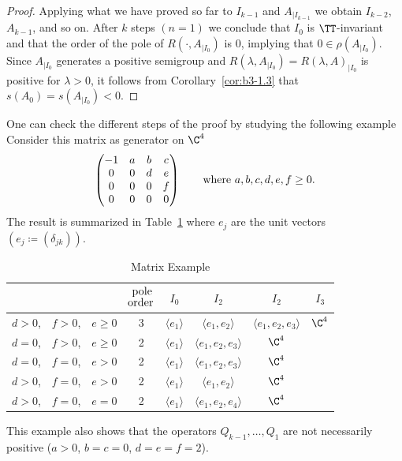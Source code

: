 \begin{proof}
	Applying what we have proved so far to $I_{k-1}$ and $A_{|I_{k-1}}$ we obtain $I_{k-2}$, $A_{k-1}$, and so on.
	After $k$ steps $(n=1)$ we conclude that $I_{0}$ is $\TT$-invariant and that the order of the pole of\/ $R(\cdot,A_{|I_{0}})$ is $0$, 
	implying that $0 \in \rho(A_{|I_{0}})$.
	Since $A_{|I_{0}}$ generates a positive semigroup and $R(\lambda,A_{|I_{0}}) = R(\lambda,A)_{|I_{0}}$ is positive for $\lambda > 0$, it follows from Corollary~\ref{cor:b3-1.3} that $s(A_{0}) = s(A_{|I_{0}}) < 0$.
\end{proof}
One can check the different steps of the proof by studying the following example
Consider this matrix as generator on $\C^{4}$
\[
\begin{pmatrix}
	-1 & a & b & c \\
	0 & 0 & d & e \\
	0 & 0 & 0 & f \\
	0 & 0 & 0 & 0
\end{pmatrix}
\quad \quad \text{where $ a,b,c,d,e,f \geq 0 $.} 
\]
The result is summarized in Table~\ref{tab:b3-table1} where 
$e_{j}$ are the unit vectors $(e_{j} \coloneqq (\delta_{jk}))$.
\begin{table}[ht!]%
% 
\begin{center}
 \caption{Matrix Example}\label{tab:b3-table1}
\begin{tabular}{lll|c|cccc} %
		 &&& $ \overset{\text{\normalsize pole}}{\text{order}}$ & $I_0$ & $I_2$ & $I_2$ & $I_3$ \\[1ex]\hline
		$ d > 0 $, & $ f>0 $, &  $ e \ge 0 $ & 3 & $\langle e_1 \rangle$ &  $\langle e_1, e_2 \rangle$ &  $\langle e_1, e_2, e_3 \rangle$ &  $\C^4$\\
		$ d = 0 $, & $ f > 0 $, & $ e \ge 0 $ & 2 & $\langle e_1 \rangle$ &  $\langle e_1, e_2, e_3 \rangle$ &  $\C^4$ & \\	
		$ d = 0 $, & $ f = 0 $, & $ e > 0 $ & 2 & $\langle e_1 \rangle$ &  $\langle e_1, e_2, e_3 \rangle$ &  $\C^4$ & \\
		$ d > 0 $, & $ f = 0 $, & $ e > 0 $ & 2 & $\langle e_1 \rangle$ &  $\langle e_1, e_2 \rangle$ &  $\C^4$ & \\			
		$ d > 0 $, & $ f = 0 $, & $ e = 0 $ & 2 & $\langle e_1 \rangle$ &  $\langle e_1, e_2, e_4 \rangle$ &  $\C^4$ & \\	
\end{tabular}
\end{center}
\end{table}
This example also shows that the operators $Q_{k-1}, \ldots, Q_{1}$ are not necessarily positive (\eg $a>0$, $b=c=0$, $d=e=f=2$).

